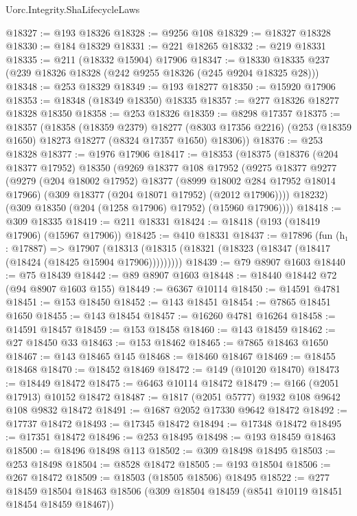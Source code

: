 \begin{lexlean}{Uorc.Integrity.ShaLifecycleLaws}
\begin{coremodule}
@18327 := @193 @18326
@18328 := @9256 @108
@18329 := @18327 @18328
@18330 := @184 @18329
@18331 := @221 @18265
@18332 := @219 @18331
@18335 := @211 (@18332 @15904) @17906
@18347 := @18330 @18335 @237 (@239 @18326 @18328 (@242 @9255 @18326 (@245 @9204 @18325 @28)))
@18348 := @253 @18329
@18349 := @193 @18277
@18350 := @15920 @17906
@18353 := @18348 (@18349 @18350) @18335
@18357 := @277 @18326 @18277 @18328 @18350
@18358 := @253 @18326
@18359 := @8298 @17357
@18375 := @18357
    (@18358
      (@18359 @2379)
      @18277
      (@8303 @17356 @2216)
      (@253 (@18359 @1650) @18273 @18277 (@8324 @17357 @1650) @18306))
@18376 := @253 @18328
@18377 := @1976 @17906
@18417 := @18353
    (@18375
      (@18376
        (@204 @18377 @17952)
        @18350
        (@9269
          @18377
          @108
          @17952
          (@9275
            @18377
            @9277
            (@9279
              (@204 @18002 @17952)
              @18377
              (@8999 @18002 @284 @17952 @18014 @17966)
              (@309 @18377 (@204 @18071 @17952) (@2012 @17906))))
          @18232)
        (@309 @18350 (@204 (@1258 @17906) @17952) (@15960 @17906))))
@18418 := @309 @18335
@18419 := @211 @18331
@18424 := @18418 (@193 (@18419 @17906) (@15967 @17906))
@18425 := @410 @18331
@18437 := @17896
    (fun (h₁ : @17887) =>
    @17907 (@18313 (@18315 (@18321 (@18323 (@18347 (@18417 (@18424 (@18425 @15904 @17906)))))))))
@18439 := @79 @8907 @1603
@18440 := @75 @18439
@18442 := @89 @8907 @1603
@18448 := @18440 @18442 @72 (@94 @8907 @1603 @155)
@18449 := @6367 @10114
@18450 := @14591 @4781
@18451 := @153 @18450
@18452 := @143 @18451
@18454 := @7865 @18451 @1650
@18455 := @143 @18454
@18457 := @16260 @4781 @16264
@18458 := @14591 @18457
@18459 := @153 @18458
@18460 := @143 @18459
@18462 := @27 @18450 @33
@18463 := @153 @18462
@18465 := @7865 @18463 @1650
@18467 := @143 @18465 @145
@18468 := @18460 @18467
@18469 := @18455 @18468
@18470 := @18452 @18469
@18472 := @149 (@10120 @18470)
@18473 := @18449 @18472
@18475 := @6463 @10114 @18472
@18479 := @166 (@2051 @17913) @10152 @18472
@18487 := @1817 (@2051 @5777) @1932 @108 @9642 @108 @9832 @18472
@18491 := @1687 @2052 @17330 @9642 @18472
@18492 := @17737 @18472
@18493 := @17345 @18472
@18494 := @17348 @18472
@18495 := @17351 @18472
@18496 := @253 @18495
@18498 := @193 @18459 @18463
@18500 := @18496 @18498 @113
@18502 := @309 @18498 @18495
@18503 := @253 @18498
@18504 := @8528 @18472
@18505 := @193 @18504
@18506 := @267 @18472
@18509 := @18503 (@18505 @18506) @18495
@18522 := @277
    @18459
    @18504
    @18463
    @18506
    (@309 @18504 @18459 (@8541 @10119 @18451 @18454 @18459 @18467))

\end{coremodule}
\end{lexlean}
